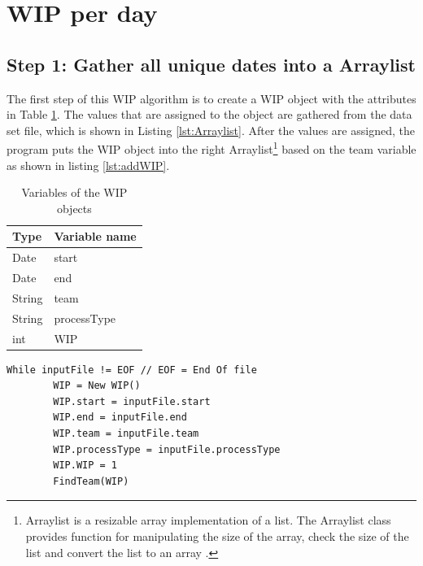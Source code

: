 \documentclass[UKenglish]{ifimaster}  %
\begin{document}
\section {WIP per day}
\label{WPD}


\subsection{Step 1: Gather all unique dates into a Arraylist}
\label{sub:stepOne}
The first step of this WIP algorithm is to create a WIP object with the attributes in Table \ref{tab:object}.  The values that are assigned to the object are gathered from the data set file, which is shown in Listing \ref{lst:Arraylist}. After the values are assigned, the program puts the WIP object into the right Arraylist\footnote{Arraylist is a resizable array implementation of a list. The Arraylist class provides function for manipulating the size of the array, check the size of the list and convert the list to an array  \parencite{Arraylist}.} based on the team variable as shown in listing \ref{lst:addWIP}. 
\begin{table}[!ht]
\begin{center}
\begin{tabular}{| l | l |}
\hline
\bf{Type} & \bf{Variable name} \\ \hline
Date & start \\ \hline
Date & end\\ \hline
String & team\\ \hline
String & processType\\ \hline
int  & WIP\\ \hline
\end{tabular}
\caption{Variables of the WIP objects}
\label{tab:object}
\end{center}
\end{table}


\begin{minipage}{\textwidth} 
 \begin{lstlisting}[caption={Gather all unique dates into Arraylist},label={lst:Arraylist}]
While inputFile != EOF // EOF = End Of file
		WIP = New WIP()
		WIP.start = inputFile.start
		WIP.end = inputFile.end
		WIP.team = inputFile.team
		WIP.processType = inputFile.processType
		WIP.WIP = 1
		FindTeam(WIP)
 \end{lstlisting}
 \end{minipage}
\end{document}
